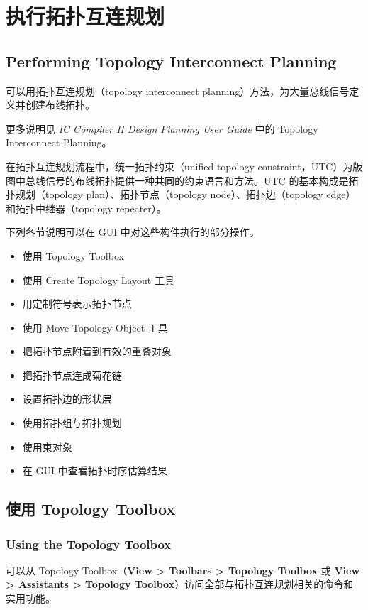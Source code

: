 \section{执行拓扑互连规划}
\subsection*{Performing Topology Interconnect Planning}

可以用拓扑互连规划（topology interconnect planning）方法，为大量总线信号定义并创建布线拓扑。

\begin{seeAlsoBox}
更多说明见 \emph{IC Compiler II Design Planning User Guide} 中的 Topology Interconnect Planning。
\end{seeAlsoBox}

在拓扑互连规划流程中，统一拓扑约束（unified topology constraint，UTC）为版图中总线信号的布线拓扑提供一种共同的约束语言和方法。UTC 的基本构成是拓扑规划（topology plan）、拓扑节点（topology node）、拓扑边（topology edge）和拓扑中继器（topology repeater）。

下列各节说明可以在 GUI 中对这些构件执行的部分操作。
\begin{itemize}
  \item 使用 Topology Toolbox
  \item 使用 Create Topology Layout 工具
  \item 用定制符号表示拓扑节点
  \item 使用 Move Topology Object 工具
  \item 把拓扑节点附着到有效的重叠对象
  \item 把拓扑节点连成菊花链
  \item 设置拓扑边的形状层
  \item 使用拓扑组与拓扑规划
  \item 使用束对象
  \item 在 GUI 中查看拓扑时序估算结果
\end{itemize}

\subsection{使用 Topology Toolbox}
\subsubsection*{Using the Topology Toolbox}

可以从 Topology Toolbox（\textbf{View > Toolbars > Topology Toolbox} 或 \textbf{View > Assistants > Topology Toolbox}）访问全部与拓扑互连规划相关的命令和实用功能。

